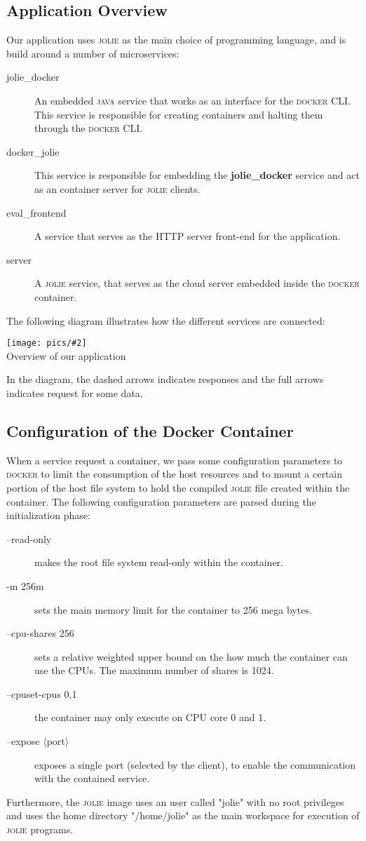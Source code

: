 \documentclass[12pt]{article}
\newcommand{\img}[3] {
	\begin{center}
	\texttt{[image: pics/\#2]}\\
	{\small #3}
	\end{center}
}
\newcommand{\docker}[0] {\textsc{docker}}
\newcommand{\jolie}[0] {\textsc{jolie}}
\newcommand{\java} {\textsc{java}}
\begin{document}
\subsection{Application Overview}
Our application uses \jolie{} as the main choice of programming language, and is build around a number of microservices:

\begin{description}
\item[jolie\_docker] An embedded \java{} service that works as an interface for the \docker{} CLI. This service is responsible for creating containers and halting them through the \docker{} CLI. 
\item[docker\_jolie] This service is responsible for embedding the \textbf{jolie\_docker} service and act as an container server for \jolie{} clients. 
\item[eval\_frontend] A service that serves as the HTTP server front-end for the application. 
\item[server] A \jolie{} service, that serves as the cloud server embedded inside the \docker{} container.
\end{description}
The following diagram illustrates how the different services are connected:
\img{0.6}{system}{Overview of our application}
In the diagram, the dashed arrows indicates responses and the full arrows indicates request for some data.

\subsection{Configuration of the Docker Container}

When a service request a container, we pass some configuration parameters to \docker{} to limit the consumption of the host resources and to mount a certain portion of the host file system to hold the compiled \jolie{} file created within the container. The following configuration parameters are parsed during the initialization phase:
\begin{description}
\item[--read-only] makes the root file system read-only within the container.
\item[-m 256m] sets the main memory limit for the container to 256 mega bytes.
\item[--cpu-shares 256] sets a relative weighted upper bound on the how much the container can use the CPUs. The maximum number of shares is 1024.
\item[--cpuset-cpus 0,1] the container may only execute on CPU core 0 and 1.
\item[--expose $\langle$port$\rangle$] exposes a single port (selected by the client), to enable the communication with the contained service.
\end{description}
Furthermore, the \jolie{} image uses an user called "jolie" with no root privileges and uses the home directory "/home/jolie" as the main workspace for execution of \jolie{} programs.  
\end{document}
